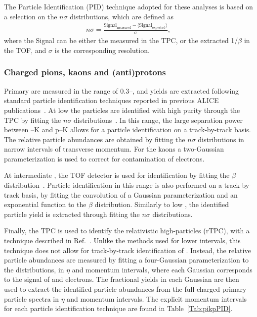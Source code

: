 The Particle Identification (PID) technique adopted for these analyses is based on a selection on the $n\sigma$ distributions, which are defined as
\begin{align*}
    n\sigma = \frac{\text{Signal}_{\textrm{measured}} - \langle
      \text{Signal}_{\textrm{expected}} \rangle}{\sigma},
\end{align*}
where the Signal can be either the measured \dedx in the TPC, or the extracted 1/$\beta$ in the TOF, and $\sigma$ is the corresponding resolution.

\subsubsection{Charged pions, kaons and (anti)protons}

Primary \pikp are measured in the range of 0.3--, and yields are extracted following standard particle identification techniques reported in previous ALICE publications~\cite{ALICE:2023yuk,ALICE:2019hno}. At low \pt the particles are identified with high purity through the TPC \dedx by fitting the $n\sigma$ distributions~\cite{ALICE:2019hno}. In this \pt range,  the large separation power between \PI--K and p--K allows for a particle identification on a track-by-track basis. The relative particle abundances are obtained by fitting the $n\sigma$ distributions in narrow intervals of transverse momentum. For the kaons a two-Gaussian parameterization is used to correct for contamination of electrons.

At intermediate \pt, the TOF detector is used for identification by fitting the $\beta$ distribution~\cite{ALICE:2020nkc}. Particle identification in this \pt range is also performed on a track-by-track basis, by fitting the convolution of a Gaussian parameterization and an exponential function to the $\beta$ distribution. Similarly to low \pt, the identified particle yield is extracted through fitting the $n\sigma$ distributions. 

Finally, the TPC \dedx is used to identify the relativistic high-\pt particles (rTPC), with a technique described in Ref.~\cite{pikp_rtpc}. Unlike the methods used for lower \pt intervals, this technique does not allow for track-by-track identification of \pikp. Instead, the relative particle abundances are measured by fitting a four-Gaussian parameterization to the \dedx distributions, in $\eta$ and momentum intervals, where each Gaussian corresponds to the signal of \pikp and electrons. The fractional yields in each Gaussian are then used to extract the identified particle abundances from the full charged primary particle \pt spectra in $\eta$ and momentum intervals. The explicit momentum intervals for each particle identification technique are found in Table~\ref{Tab:pikpPID}.





